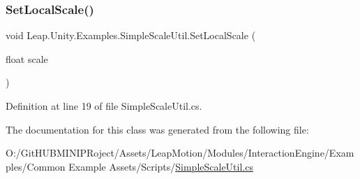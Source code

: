\subsubsection{\texorpdfstring{SetLocalScale()}{SetLocalScale()}}
{\footnotesize\ttfamily void Leap.\+Unity.\+Examples.\+Simple\+Scale\+Util.\+Set\+Local\+Scale (\begin{DoxyParamCaption}\item[{float}]{scale }\end{DoxyParamCaption})}



Definition at line 19 of file Simple\+Scale\+Util.\+cs.



The documentation for this class was generated from the following file\+:\begin{DoxyCompactItemize}
\item 
O\+:/\+Git\+H\+U\+B\+M\+I\+N\+I\+P\+Roject/\+Assets/\+Leap\+Motion/\+Modules/\+Interaction\+Engine/\+Examples/\+Common Example Assets/\+Scripts/\mbox{\hyperlink{_simple_scale_util_8cs}{Simple\+Scale\+Util.\+cs}}\end{DoxyCompactItemize}

